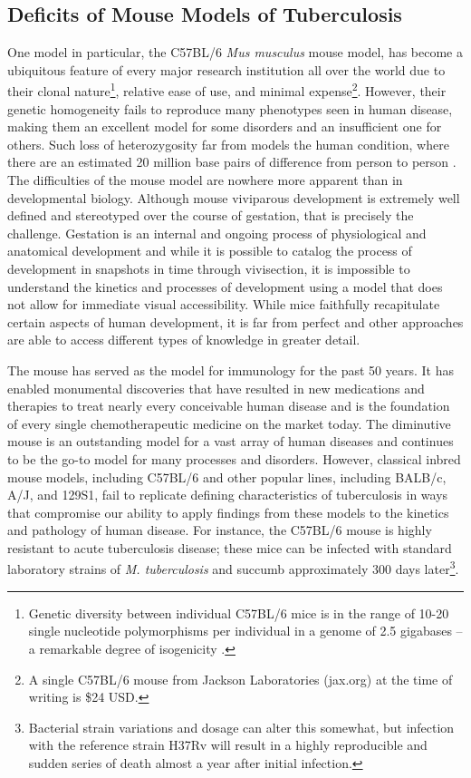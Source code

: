 \subsection{Deficits of Mouse Models of Tuberculosis}\label{mouse}

One model in particular, the C57BL/6 \textit{Mus musculus} mouse model, has become a ubiquitous feature of every major research institution all over the world due to their clonal nature\footnote{Genetic diversity between individual C57BL/6 mice is in the range of 10\hyp{}20 single nucleotide polymorphisms per individual in a genome of 2.5 gigabases -- a remarkable degree of isogenicity \citep{Bryant2011, Sarsani2019}.}, relative ease of use, and minimal expense\footnote{A single C57BL/6 mouse from Jackson Laboratories (jax.org) at the time of writing is \$24 USD.}. However, their genetic homogeneity fails to reproduce many phenotypes seen in human disease, making them an excellent model for some disorders and an insufficient one for others. Such loss of heterozygosity far from models the human condition, where there are an estimated 20 million base pairs of difference from person to person \citep{Genomes2015}. The difficulties of the mouse model are nowhere more apparent than in developmental biology. Although mouse viviparous development is extremely well defined and stereotyped over the course of gestation, that is precisely the challenge. Gestation is an internal and ongoing process of physiological and anatomical development and while it is possible to catalog the process of development in snapshots in time through vivisection, it is impossible to understand the kinetics and processes of development using a model that does not allow for immediate visual accessibility. While mice faithfully recapitulate certain aspects of human development, it is far from perfect and other approaches are able to access different types of knowledge in greater detail.

The mouse has served as the model for immunology for the past 50 years. It has enabled monumental discoveries that have resulted in new medications and therapies to treat nearly every conceivable human disease and is the foundation of every single chemotherapeutic medicine on the market today. The diminutive mouse is an outstanding model for a vast array of human diseases and continues to be the go\hyp{}to model for many processes and disorders. However, classical inbred mouse models, including C57BL/6 and other popular lines, including BALB/c, A/J, and 129S1, fail to replicate defining characteristics of tuberculosis in ways that compromise our ability to apply findings from these models to the kinetics and pathology of human disease. For instance, the C57BL/6 mouse is highly resistant to acute tuberculosis disease; these mice can be infected with standard laboratory strains of \textit{M. tuberculosis} and succumb approximately 300 days later\footnote{Bacterial strain variations and dosage can alter this somewhat, but infection with the reference strain H37Rv will result in a highly reproducible and sudden series of death almost a year after initial infection.}.

